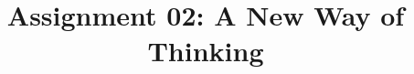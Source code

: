 \documentclass{article}
\title{Assignment 02: A New Way of Thinking}
\begin{document}
\renderTitle
\end{document}

